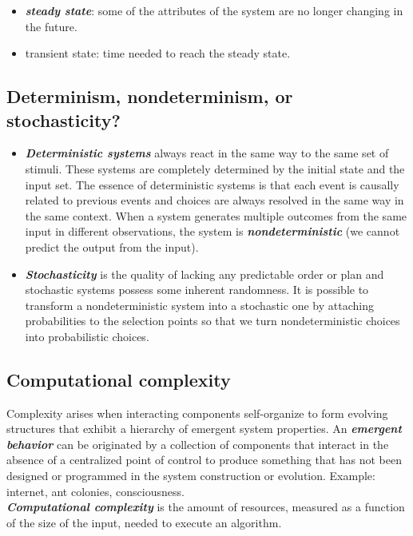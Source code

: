 \begin{itemize}
\tightlist
\item
  \textbf{\emph{steady state}}: some of the attributes of the system are
  no longer changing in the future.
\item
  transient state: time needed to reach the steady state.
\end{itemize}

\hypertarget{determinism-nondeterminism-or-stochasticity}{%
\subsection{Determinism, nondeterminism, or
stochasticity?}\label{determinism-nondeterminism-or-stochasticity}}

\begin{itemize}
\tightlist
\item
  \textbf{\emph{Deterministic systems}} always react in the same way to
  the same set of stimuli. These systems are completely determined by
  the initial state and the input set. The essence of deterministic
  systems is that each event is causally related to previous events and
  choices are always resolved in the same way in the same context. When
  a system generates multiple outcomes from the same input in different
  observations, the system is \textbf{\emph{nondeterministic}} (we
  cannot predict the output from the input).
\item
  \textbf{\emph{Stochasticity}} is the quality of lacking any
  predictable order or plan and stochastic systems possess some inherent
  randomness. It is possible to transform a nondeterministic system into
  a stochastic one by attaching probabilities to the selection points so
  that we turn nondeterministic choices into probabilistic choices.
\end{itemize}

\hypertarget{computational-complexity}{%
\subsection{Computational
complexity}\label{computational-complexity}}

Complexity arises when interacting components self-organize to form
evolving structures that exhibit a hierarchy of emergent system
properties. An \textbf{\emph{emergent behavior}} can be originated by a
collection of components that interact in the absence of a centralized
point of control to produce something that has not been designed or
programmed in the system construction or evolution. Example: internet,
ant colonies, consciousness.\\
\textbf{\emph{Computational complexity}} is the amount of resources,
measured as a function of the size of the input, needed to execute an
algorithm.

